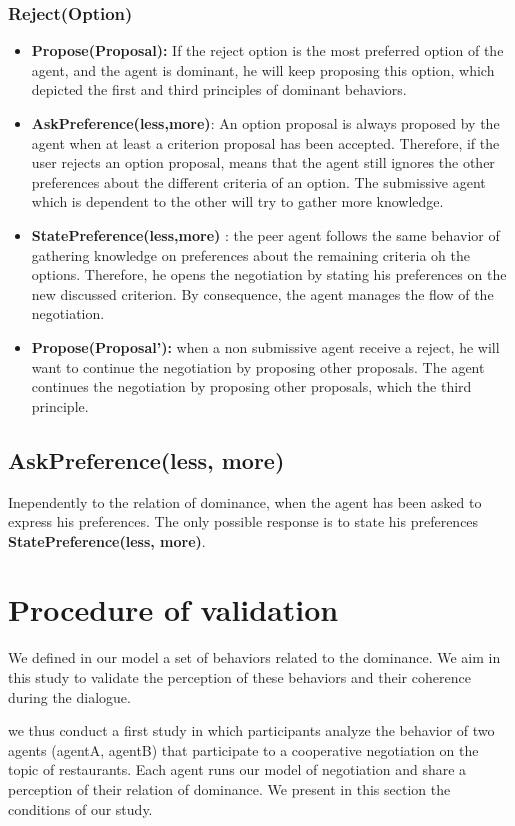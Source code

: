 \documentclass{llncs}
\begin{document}
 		
 		\subsubsection{Reject(Option)}
 		\begin{itemize}
 			\item \textbf{Propose(Proposal):} If the reject option is the most preferred option of the agent, and the agent is dominant, he will keep proposing this option, which depicted the first and third principles of dominant behaviors.
 			
 			\item \textbf{AskPreference(less,more)}: An option proposal is always proposed by the agent when at least a criterion proposal has been accepted. Therefore, if the user rejects an option proposal, means that the agent still ignores the other preferences about the different criteria of an option. The submissive agent which is dependent to the other will try to gather more knowledge.
 			
 			\item \textbf{StatePreference(less,more)} : the peer agent follows the same behavior of gathering knowledge on preferences about the remaining  criteria oh the options. Therefore, he opens the negotiation by stating his preferences on the new discussed criterion. By consequence, the agent manages the flow of the negotiation. 
 			
 			\item \textbf{Propose(Proposal'):} when a non submissive agent receive a reject, he will want to continue the negotiation by proposing other proposals. The agent continues the negotiation by proposing other proposals, which the third principle.
	\end{itemize}
\subsection{AskPreference(less, more)} Inependently to the relation of dominance, when the agent has been asked to express his preferences. The only possible response is to state his preferences \textbf{StatePreference(less, more)}.



\section{Procedure of validation}
We defined in our model a set of behaviors related to the dominance. We aim in this study to validate the perception of these behaviors and their coherence during the dialogue.
\par we thus conduct a first study in which participants analyze the behavior of  two agents (agentA, agentB)  that participate to a cooperative negotiation on the topic of restaurants. Each agent runs our model of negotiation and share a perception of their relation of dominance. We present in this section the conditions of our study.
\end{document}
